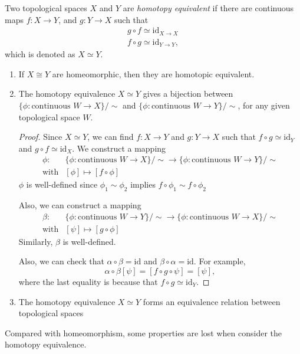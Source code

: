 \begin{definition}
Two topological spaces $X$ and $Y$ are \emph{homotopy equivalent} if there are continuous maps $f:X\to Y$, and $g:Y\to X$ such that
\[
\begin{array}{l}
g\circ f\simeq \text{id}_{X\to X}\\
f\circ g\simeq\text{id}_{Y\to Y},
\end{array}
\]
which is denoted as $X\simeq Y$.
\end{definition}
\begin{remark}
\begin{enumerate}
\item
If $X\cong Y$ are homeomorphic, then they are homotopic equivalent.
\item
The homotopy equivalence $X\simeq Y$ gives a bijection between $\{\phi:\text{continuous }W\to X\}/\sim$ and $\{\phi:\text{continuous }W\to Y\}/\sim$, for any given topological space $W$.
\begin{proof}
Since $X\simeq Y$, we can find $f:X\to Y$ and $g:Y\to X$ such that $f\circ g\simeq\text{id}_Y$ and $g\circ f\simeq\text{id}_X$.
We construct a mapping
\[
\begin{array}{ll}
\phi:&\{\phi:\text{continuous }W\to X\}/\sim\to \{\phi:\text{continuous }W\to Y\}/\sim\\
\text{with}&[\phi]\mapsto[f\circ\phi]
\end{array}
\]
$\phi$ is well-defined since $\phi_1\sim\phi_2$ implies $f\circ\phi_1\sim f\circ\phi_2$

Also, we can construct a mapping
\[
\begin{array}{ll}
\beta:& \{\phi:\text{continuous }W\to Y\}/\sim\to\{\phi:\text{continuous }W\to X\}/\sim\\
\text{with}&[\psi]\mapsto[g\circ\phi]
\end{array}
\]
Similarly, $\beta$ is well-defined.

Also, we can check that $\alpha\circ\beta=\text{id}$ and $\beta\circ\alpha=\text{id}$.
For example,
\[
\alpha\circ\beta[\psi]=[f\circ g\circ\psi]=[\psi],
\]
where the last equality is because that $f\circ g\simeq\text{id}_Y$.
\end{proof}
\item
The homotopy equivalence $X\simeq Y$ forms an equivalence relation between topological spaces
\end{enumerate}
\end{remark}

Compared with homeomorphism, some properties are lost when consider the homotopy equivalence.

